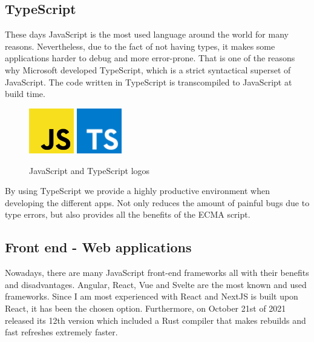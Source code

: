 \documentclass[a4paper, 12pt, oneside]{book}
\begin{document}
\subsection{TypeScript}
These days JavaScript is the most used language around the world for many reasons. Nevertheless, due to the fact of not having types, it makes some applications harder to debug and more error-prone. That is one of the reasons why Microsoft developed TypeScript, which is a strict syntactical superset of JavaScript. The code written in TypeScript is transcompiled to JavaScript at build time.
\begin{figure}[H]
	\centering
	\includegraphics[width=0.175\textwidth]{assets/js-logo.png}
	\includegraphics[width=0.175\textwidth]{assets/ts-logo.png}
	\caption{JavaScript and TypeScript logos}
\end{figure}
By using TypeScript we provide a highly productive environment when developing the different apps. Not only reduces the amount of painful bugs due to type errors, but also provides all the benefits of the ECMA script.
\subsection{Front end - Web applications}
Nowadays, there are many JavaScript front-end frameworks all with their benefits and disadvantages. Angular, React, Vue and Svelte are the most known and used frameworks. Since I am most experienced with React and NextJS is built upon React, it has been the chosen option. Furthermore, on October 21st of 2021 released its 12th version which included a Rust compiler that makes rebuilds and fast refreshes extremely faster.
\end{document}
